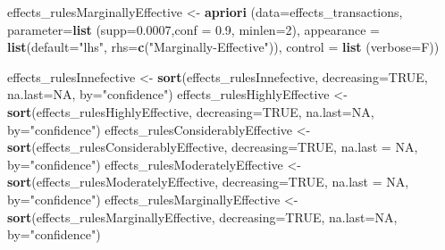 \documentclass[spanish,]{article}
\newenvironment{Shaded}{\begin{snugshade}}{\end{snugshade}}
\newcommand{\KeywordTok}[1]{\textcolor[rgb]{0.13,0.29,0.53}{\textbf{#1}}}
\newcommand{\DataTypeTok}[1]{\textcolor[rgb]{0.13,0.29,0.53}{#1}}
\newcommand{\DecValTok}[1]{\textcolor[rgb]{0.00,0.00,0.81}{#1}}
\newcommand{\FloatTok}[1]{\textcolor[rgb]{0.00,0.00,0.81}{#1}}
\newcommand{\StringTok}[1]{\textcolor[rgb]{0.31,0.60,0.02}{#1}}
\newcommand{\OtherTok}[1]{\textcolor[rgb]{0.56,0.35,0.01}{#1}}
\newcommand{\NormalTok}[1]{#1}
\begin{document}
\begin{Shaded}
\begin{Highlighting}[]
\NormalTok{effects_rulesMarginallyEffective <-}\StringTok{ }\KeywordTok{apriori}\NormalTok{ (}\DataTypeTok{data=}\NormalTok{effects_transactions, }
                                     \DataTypeTok{parameter=}\KeywordTok{list}\NormalTok{ (}\DataTypeTok{supp=}\FloatTok{0.0007}\NormalTok{,}\DataTypeTok{conf =} \FloatTok{0.9}\NormalTok{, }\DataTypeTok{minlen=}\DecValTok{2}\NormalTok{), }
                                     \DataTypeTok{appearance =} \KeywordTok{list}\NormalTok{(}\DataTypeTok{default=}\StringTok{"lhs"}\NormalTok{,}
                                                       \DataTypeTok{rhs=}\KeywordTok{c}\NormalTok{(}\StringTok{"Marginally-Effective"}\NormalTok{)), }
                                     \DataTypeTok{control =} \KeywordTok{list}\NormalTok{ (}\DataTypeTok{verbose=}\NormalTok{F))}


\NormalTok{effects_rulesInnefective <-}\StringTok{ }\KeywordTok{sort}\NormalTok{(effects_rulesInnefective, }
                                 \DataTypeTok{decreasing=}\OtherTok{TRUE}\NormalTok{, }\DataTypeTok{na.last=}\OtherTok{NA}\NormalTok{, }\DataTypeTok{by=}\StringTok{"confidence"}\NormalTok{)}
\NormalTok{effects_rulesHighlyEffective <-}\StringTok{ }\KeywordTok{sort}\NormalTok{(effects_rulesHighlyEffective, }
                                     \DataTypeTok{decreasing=}\OtherTok{TRUE}\NormalTok{, }\DataTypeTok{na.last=}\OtherTok{NA}\NormalTok{, }\DataTypeTok{by=}\StringTok{"confidence"}\NormalTok{)}
\NormalTok{effects_rulesConsiderablyEffective <-}\StringTok{ }\KeywordTok{sort}\NormalTok{(effects_rulesConsiderablyEffective, }
                                           \DataTypeTok{decreasing=}\OtherTok{TRUE}\NormalTok{, }\DataTypeTok{na.last =} \OtherTok{NA}\NormalTok{, }\DataTypeTok{by=}\StringTok{"confidence"}\NormalTok{)}
\NormalTok{effects_rulesModeratelyEffective <-}\StringTok{ }\KeywordTok{sort}\NormalTok{(effects_rulesModeratelyEffective, }
                                         \DataTypeTok{decreasing=}\OtherTok{TRUE}\NormalTok{, }\DataTypeTok{na.last =} \OtherTok{NA}\NormalTok{, }\DataTypeTok{by=}\StringTok{"confidence"}\NormalTok{)}
\NormalTok{effects_rulesMarginallyEffective <-}\StringTok{ }\KeywordTok{sort}\NormalTok{(effects_rulesMarginallyEffective,}
                                         \DataTypeTok{decreasing=}\OtherTok{TRUE}\NormalTok{, }\DataTypeTok{na.last=}\OtherTok{NA}\NormalTok{, }\DataTypeTok{by=}\StringTok{"confidence"}\NormalTok{)}
\end{Highlighting}
\end{Shaded}
\end{document}
